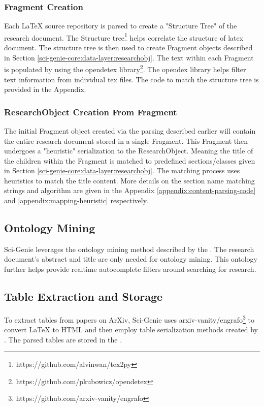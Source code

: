 \subsubsection{Fragment Creation}
\label{sci-genie-core:scraping:source-frag}
Each LaTeX source repository is parsed to create a "Structure Tree" of the research document. The Structure tree\footnote{https://github.com/alvinwan/tex2py} helps correlate the structure of latex document. The structure tree is then used to create Fragment objects described in Section \ref{sci-genie-core:data-layer:researchobj}. The text within each Fragment is populated by using the opendetex library\footnote{https://github.com/pkubowicz/opendetex}. The opendex library helps filter text information from individual tex files. The code to match the structure tree is provided in the Appendix. 

\subsubsection{ResearchObject Creation From Fragment}
\label{sci-genie-core:scraping:frag-to-rs}
The initial Fragment object created via the parsing described earlier will contain the entire research document stored in a single Fragment. This Fragment then undergoes a "heuristic" serialization to the ResearchObject. Meaning the title of the children within the Fragment is matched to predefined sections/classes given in Section \ref{sci-genie-core:data-layer:researchobj}. The matching process uses heuristics to match the title content. More details on the section name matching strings and algorithm are given in the Appendix \ref{appendix:content-parsing-code} and \ref{appendix:mapping-heuristic} respectively. 

\subsection{Ontology Mining}
Sci-Genie leverages the ontology mining method described by the \cite{salatino2020ontology}. The research document's abstract and title are only needed for ontology mining. This ontology further helps provide realtime autocomplete filters around searching for research.

\subsection{Table Extraction and Storage}
To extract tables from papers on ArXiv, Sci-Genie uses arxiv-vanity/engrafo\footnote{https://github.com/arxiv-vanity/engrafo} to convert LaTeX to HTML and then employ table serialization methods created by \cite{kardas2020axcell}. The parsed tables are stored in the . 


